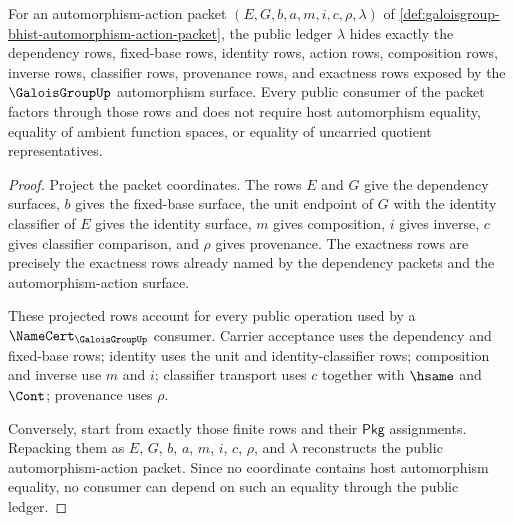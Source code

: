 \begin{theorem}
\label{thm:galoisgroup-automorphism-ledger-exactness}
For an automorphism-action packet $(E,G,b,a,m,i,c,\rho,\lambda)$ of
\autoref{def:galoisgroup-bhist-automorphism-action-packet}, the public ledger
$\lambda$ hides exactly the dependency rows, fixed-base rows, identity rows,
action rows, composition rows, inverse rows, classifier rows, provenance rows,
and exactness rows exposed by the $\GaloisGroupUp$ automorphism surface. Every
public consumer of the packet factors through those rows and does not require
host automorphism equality, equality of ambient function spaces, or equality of
uncarried quotient representatives.
\end{theorem}
\begin{proof}
Project the packet coordinates. The rows $E$ and $G$ give the dependency
surfaces, $b$ gives the fixed-base surface, the unit endpoint of $G$ with the
identity classifier of $E$ gives the identity surface, $m$ gives composition,
$i$ gives inverse, $c$ gives classifier comparison, and $\rho$ gives
provenance. The exactness rows are precisely the exactness rows already named
by the dependency packets and the automorphism-action surface.

These projected rows account for every public operation used by a
$\NameCert_{\GaloisGroupUp}$ consumer. Carrier acceptance uses the dependency
and fixed-base rows; identity uses the unit and identity-classifier rows;
composition and inverse use $m$ and $i$; classifier transport uses $c$ together
with $\hsame$ and $\Cont$; provenance uses $\rho$.

Conversely, start from exactly those finite rows and their $\mathsf{Pkg}$
assignments. Repacking them as $E$, $G$, $b$, $a$, $m$, $i$, $c$, $\rho$, and
$\lambda$ reconstructs the public automorphism-action packet. Since no
coordinate contains host automorphism equality, no consumer can depend on such
an equality through the public ledger.
\end{proof}

